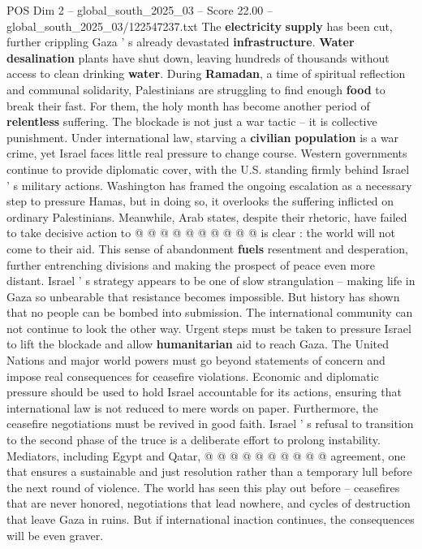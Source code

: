 \begin{textsample}{POS Dim 2 – global\_south\_2025\_03 – Score 22.00 – global\_south\_2025\_03/122547237.txt}
The \textbf{electricity} \textbf{supply} has been cut, further crippling Gaza ' s already devastated \textbf{infrastructure}. \textbf{Water} \textbf{desalination} plants have shut down, leaving hundreds of thousands without access to clean drinking \textbf{water}.
During \textbf{Ramadan}, a time of spiritual reflection and communal solidarity, Palestinians are struggling to find enough \textbf{food} to break their fast.
For them, the holy month has become another period of \textbf{relentless} suffering.
The blockade is not just a war tactic -- it is collective punishment.
Under international law, starving a \textbf{civilian} \textbf{population} is a war crime, yet Israel faces little real pressure to change course.
Western governments continue to provide diplomatic cover, with the U.S. standing firmly behind Israel ' s military actions.
Washington has framed the ongoing escalation as a necessary step to pressure Hamas, but in doing so, it overlooks the suffering inflicted on ordinary Palestinians.
Meanwhile, Arab states, despite their rhetoric, have failed to take decisive action to @ @ @ @ @ @ @ @ @ @ is clear : the world will not come to their aid.
This sense of abandonment \textbf{fuels} resentment and desperation, further entrenching divisions and making the prospect of peace even more distant.
Israel ' s strategy appears to be one of slow strangulation -- making life in Gaza so unbearable that resistance becomes impossible.
But history has shown that no people can be bombed into submission.
The international community can not continue to look the other way.
Urgent steps must be taken to pressure Israel to lift the blockade and allow \textbf{humanitarian} aid to reach Gaza.
The United Nations and major world powers must go beyond statements of concern and impose real consequences for ceasefire violations.
Economic and diplomatic pressure should be used to hold Israel accountable for its actions, ensuring that international law is not reduced to mere words on paper.
Furthermore, the ceasefire negotiations must be revived in good faith.
Israel ' s refusal to transition to the second phase of the truce is a deliberate effort to prolong instability.
Mediators, including Egypt and Qatar, @ @ @ @ @ @ @ @ @ @ agreement, one that ensures a sustainable and just resolution rather than a temporary lull before the next round of violence.
The world has seen this play out before -- ceasefires that are never honored, negotiations that lead nowhere, and cycles of destruction that leave Gaza in ruins.
But if international inaction continues, the consequences will be even graver.

\end{textsample}
